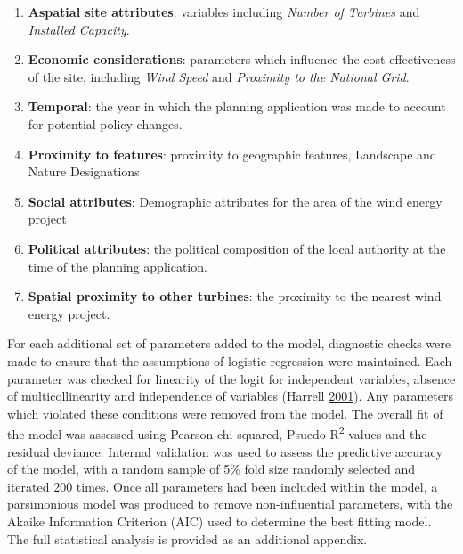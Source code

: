 \documentclass[a4paper,]{article}
\providecommand{\tightlist}{%
  \setlength{\itemsep}{0pt}\setlength{\parskip}{0pt}}
\theoremstyle{definition}
\theoremstyle{definition}
\theoremstyle{definition}
\theoremstyle{remark}
\begin{document}
\begin{enumerate}
\def\labelenumi{\arabic{enumi}.}
\tightlist
\item
  \textbf{Aspatial site attributes}: variables including \emph{Number of
  Turbines} and \emph{Installed Capacity}.
\item
  \textbf{Economic considerations}: parameters which influence the cost
  effectiveness of the site, including \emph{Wind Speed} and
  \emph{Proximity to the National Grid}.
\item
  \textbf{Temporal}: the year in which the planning application was made
  to account for potential policy changes.
\item
  \textbf{Proximity to features}: proximity to geographic features,
  Landscape and Nature Designations
\item
  \textbf{Social attributes}: Demographic attributes for the area of the
  wind energy project
\item
  \textbf{Political attributes}: the political composition of the local
  authority at the time of the planning application.
\item
  \textbf{Spatial proximity to other turbines}: the proximity to the
  nearest wind energy project.
\end{enumerate}

For each additional set of parameters added to the model, diagnostic
checks were made to ensure that the assumptions of logistic regression
were maintained. Each parameter was checked for linearity of the logit
for independent variables, absence of multicollinearity and independence
of variables (Harrell \protect\hyperlink{ref-Harrell2001}{2001}). Any
parameters which violated these conditions were removed from the model.
The overall fit of the model was assessed using Pearson chi-squared,
Psuedo R\textsuperscript{2} values and the residual deviance. Internal
validation was used to assess the predictive accuracy of the model, with
a random sample of 5\% fold size randomly selected and iterated 200
times. Once all parameters had been included within the model, a
parsimonious model was produced to remove non-influential parameters,
with the Akaike Information Criterion (AIC) used to determine the best
fitting model. The full statistical analysis is provided as an
additional appendix.
\end{document}
